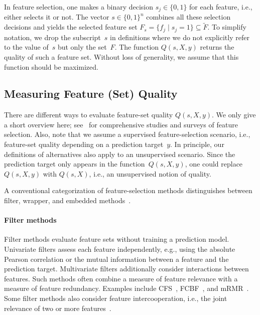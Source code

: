\documentclass{article}
\theoremstyle{definition}
\begin{document}
In feature selection, one makes a binary decision $s_j \in \{0,1\}$ for each feature, i.e., either selects it or not.
The vector $s \in \{0,1\}^n$ combines all these selection decisions and yields the selected feature set $F_s = \{f_j \mid s_j=1\} \subseteq \tilde{F}$.
To simplify notation, we drop the subscript~$s$ in definitions where we do not explicitly refer to the value of~$s$ but only the set~$F$.
The function $Q(s,X,y)$ returns the quality of such a feature set.
Without loss of generality, we assume that this function should be maximized.

\subsection{Measuring Feature (Set) Quality}
\label{sec:afs:fundamentals:quality}

There are different ways to evaluate feature-set quality $Q(s,X,y)$.
We only give a short overview here; see~\cite{chandrashekar2014survey, li2017feature, njoku2023wrapper} for comprehensive studies and surveys of feature selection.
Also, note that we assume a supervised feature-selection scenario, i.e., feature-set quality depending on a prediction target~$y$.
In principle, our definitions of alternatives also apply to an unsupervised scenario.
Since the prediction target only appears in the function~$Q(s,X,y)$, one could replace~$Q(s,X,y)$ with $Q(s,X)$, i.e., an unsupervised notion of quality.

A conventional categorization of feature-selection methods distinguishes between filter, wrapper, and embedded methods~\cite{guyon2003introduction}.

\paragraph{Filter methods}

Filter methods evaluate feature sets without training a prediction model.
Univariate filters assess each feature independently, e.g., using the absolute Pearson correlation or the mutual information between a feature and the prediction target.
Multivariate filters additionally consider interactions between features.
Such methods often combine a measure of feature relevance with a measure of feature redundancy.
Examples include CFS~\cite{hall1999correlation, hall2000correlation}, FCBF~\cite{yu2003feature}, and mRMR~\cite{peng2005feature}.
Some filter methods also consider feature intercooperation, i.e., the joint relevance of two or more features~\cite{sosa2024feature}.
\end{document}
